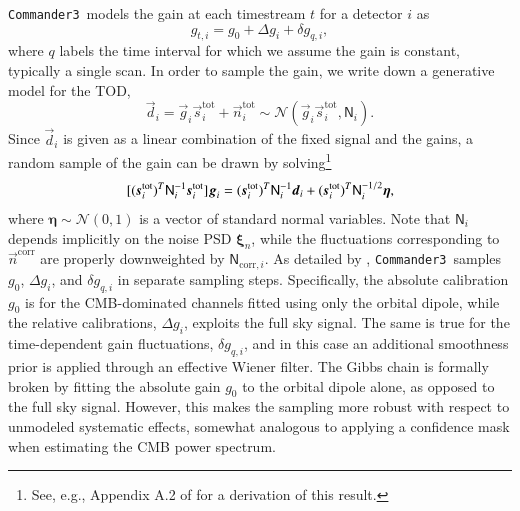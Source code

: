 \documentclass[twocolumn]{../../common/aa}
\def\commanderthree{\texttt{Commander3}}
\newcommand{\dv}[0]{\vec{d}}
\newcommand{\n}[0]{\vec{n}}
\newcommand{\s}[0]{\vec{s}}
\newcommand{\g}[0]{\vec{g}}
\newcommand{\N}[0]{\tens{N}}
\newcommand{\ncorr}{\vec n^\mathrm{corr}}
\begin{document}
\commanderthree\ models the gain at each timestream $t$ for a detector $i$ as
\begin{equation}
	g_{t,i}=g_0+\Delta g_i+\delta g_{q,i},
\end{equation}
where $q$ labels the time interval for which we assume the gain is constant, typically a single scan. In order to sample the gain, we write down a generative model for the TOD,
\begin{equation}
	\dv_i=\g_{i}\s_{i}^\mathrm{tot} +\n_{i}^\mathrm{tot}\sim\mathcal N(\g_i\s_{i}^\mathrm{tot},\mathsf N_i).
\end{equation}
Since $\dv_i$ is given as a linear combination of the fixed signal and the gains, a random sample of the gain can be drawn by solving\footnote{See, e.g., Appendix A.2 of \citet{bp01} for a derivation of this result.}
\begin{equation}
	\label{eq:gain_gauss_samp}
	[(\s_i^\mathrm{tot})^T\mathsf N_i^{-1}\s_i^\mathrm{tot}]\g_i
	=(\s_i^\mathrm{tot})^T\N^{-1}_i\dv_i
	+(\s_i^\mathrm{tot})^T\N^{-1/2}_i\boldsymbol\eta,
\end{equation}
where $\boldsymbol\eta\sim\mathcal N(0,1)$ is a vector of standard normal variables.
Note that $\mathsf N_i$ depends implicitly on the noise PSD $\boldsymbol \xi_n$, while the fluctuations corresponding to $\ncorr$ are properly downweighted by $\mathsf N_{\mathrm{corr},i}$.
As detailed by \citet{bp07}, \commanderthree\ samples $g_0$, $\Delta g_i$, and $\delta g_{q,i}$ in separate sampling steps. Specifically, the absolute calibration $g_0$ is for the CMB-dominated channels fitted using only the orbital dipole, while the relative calibrations, $\Delta g_i$, exploits the full sky signal. The same is true for the time-dependent gain fluctuations, $\delta g_{q,i}$, and in this case an additional smoothness prior is applied through an effective Wiener filter. The Gibbs chain is formally broken by fitting the absolute gain $g_0$ to the orbital dipole alone, as opposed to the full sky signal. However, this makes the sampling more robust with respect to unmodeled systematic effects, somewhat analogous to applying a confidence mask when estimating the CMB power spectrum.
\end{document}
